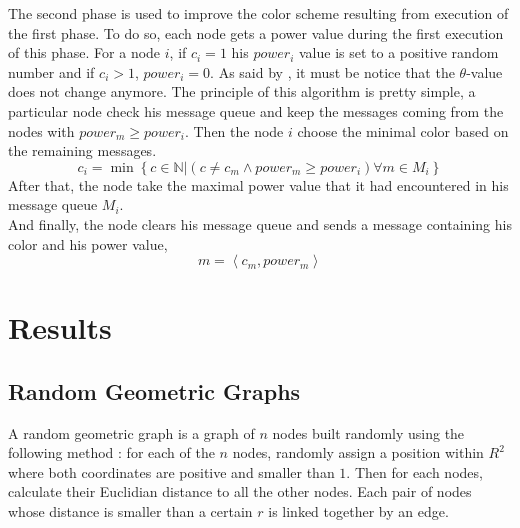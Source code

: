 \documentclass[letterpaper]{article}
\begin{document}
The second phase is used to improve the color scheme resulting from execution of the first phase. To do so, each node gets a power value during the first execution of this phase. For a node $i$, if $c_i = 1$ his $power_i$ value is set to a positive random number and if $c_i > 1$, $power_i = 0$. As said by \cite{HB10}, it must be notice that the $\theta$-value does not change anymore. The principle of this algorithm is pretty simple, a particular node check his message queue and keep the messages coming from the nodes with $power_m \geq power_i$. Then the node $i$ choose the minimal color based on the remaining messages.
\begin{equation*}
c_i = \min \left\lbrace c \in \mathbb{N} | \left(c \neq c_m \land power_m \geq power_i \right) \forall m \in M_i \right\rbrace   
\end{equation*}
After that, the node take the maximal power value that it had encountered in his message queue $M_i$.\\
And finally, the node clears his message queue and sends a message containing his color and his power value, \[ m = \left\langle c_m, power_m \right\rangle \]

\section{Results}
\subsection{Random Geometric Graphs}
A random geometric graph is a graph of $n$ nodes built randomly using the following method : for each of the $n$ nodes, randomly assign a position within $R^2$ where both coordinates are positive and smaller than $1$. Then for each nodes, calculate their Euclidian distance to all the other nodes. Each pair of nodes whose distance is smaller than a certain $r$ is linked together by an edge.\\
\end{document}

